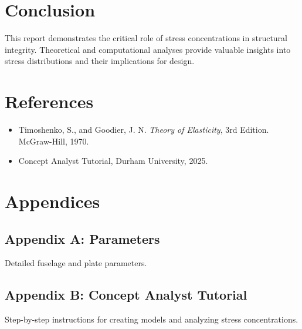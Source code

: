 \documentclass[a4paper,11pt]{article}
\begin{document}
\section{Conclusion}
This report demonstrates the critical role of stress concentrations in structural integrity. Theoretical and computational analyses provide valuable insights into stress distributions and their implications for design.

\newpage
\section*{References}
\begin{itemize}
    \item Timoshenko, S., and Goodier, J. N. \textit{Theory of Elasticity}, 3rd Edition. McGraw-Hill, 1970.
    \item Concept Analyst Tutorial, Durham University, 2025.
\end{itemize}

\section*{Appendices}
\subsection*{Appendix A: Parameters}
Detailed fuselage and plate parameters.

\subsection*{Appendix B: Concept Analyst Tutorial}
Step-by-step instructions for creating models and analyzing stress concentrations.
\end{document}
